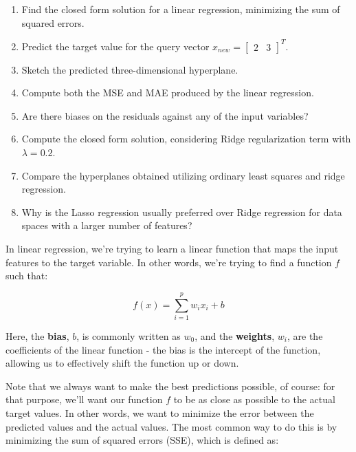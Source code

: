 \documentclass[12pt]{article}
\begin{document}
\begin{enumerate}[leftmargin=\labelsep]
{        \begin{enumerate}
          \item Find the closed form solution for a linear regression, minimizing the
                sum of squared errors.
          \item Predict the target value for the query vector $x_{new} = \begin{bmatrix} 2 & 3 \end{bmatrix}^T$.
          \item Sketch the predicted three-dimensional hyperplane.
          \item Compute both the MSE and MAE produced by the linear regression.
          \item Are there biases on the residuals against any of the input variables?
          \item Compute the closed form solution, considering Ridge regularization term with $\lambda = 0.2$.
          \item Compare the hyperplanes obtained utilizing ordinary least squares and ridge regression.
          \item Why is the Lasso regression usually preferred over Ridge regression for data spaces with a larger number of features?
        \end{enumerate}
        }

        In linear regression, we're trying to learn a linear function that maps the
        input features to the target variable. In other words, we're trying to find
        a function $f$ such that:

        \begin{equation*}
          f(x) = \sum_{i=1}^p w_i x_i + b
        \end{equation*}

        Here, the \textbf{bias}, $b$, is commonly written as $w_0$, and the
        \textbf{weights}, $w_i$, are the coefficients of the linear function - the bias
        is the intercept of the function, allowing us to effectively shift the
        function up or down.

        Note that we always want to make the best predictions possible, of course:
        for that purpose, we'll want our function $f$ to be as close as possible to
        the actual target values. In other words, we want to minimize the error
        between the predicted values and the actual values.
        The most common way to do this is by minimizing the sum of squared errors
        (SSE), which is defined as:


\end{enumerate}
\end{document}
